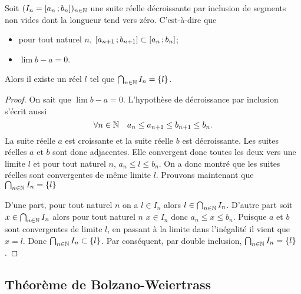 \begin{theo}
  Soit $(I_n=\left[ a_n \, ;  b_n \right])_{n \in \mathbb{N}}$ une suite réelle décroissante par inclusion de segments non vides dont la longueur tend vers zéro. C'est-à-dire que
  \begin{itemize}
  \item pour tout naturel $n$, $\left[ a_{n+1} \, ;  b_{n+1} \right] \subset \left[ a_{n} \, ;  b_{n} \right]$;
  \item $\lim b-a =0$.
  \end{itemize}
Alors il existe un réel $l$ tel que $\bigcap_{n \in \mathbb{N}} I_n = \{l\}$.
\end{theo}
\begin{proof}
  On sait que $\lim b-a = 0$. L'hypothèse de décroissance par inclusion s'écrit aussi
  \begin{equation}
    \forall n \in \mathbb{N} \quad a_n \leq a_{n+1} \leq b_{n+1} \leq b_n.
  \end{equation}
La suite réelle $a$ est croissante et la suite réelle $b$ est décroissante. Les suites réelles $a$ et $b$ sont donc adjacentes. Elle convergent donc toutes les deux vers une limite $l$ et pour tout naturel $n$, $a_n \leq l \leq b_n$. On a donc montré que les suites réelles sont convergentes de même limite $l$. Prouvons maintenant que $\bigcap_{n \in \mathbb{N}} I_n = \{l\}$

D'une part, pour tout naturel $n$ on a $l \in I_n$ alors $l \in \bigcap_{n \in \mathbb{N}} I_n$. D'autre part soit $x \in \bigcap_{n \in \mathbb{N}} I_n$ alors pour tout naturel $n$ $x \in I_n$ donc $a_n \leq x \leq b_n$. Puisque $a$ et $b$ sont convergentes de limite $l$, en passant à la limite dans l'inégalité il vient que $x=l$. Donc $\bigcap_{n \in \mathbb{N}} I_n \subset \{l\}$. Par conséquent, par double inclusion, $\bigcap_{n \in \mathbb{N}} I_n = \{l\}$.
\end{proof}

\subsection{Théorème de Bolzano-Weiertrass}

